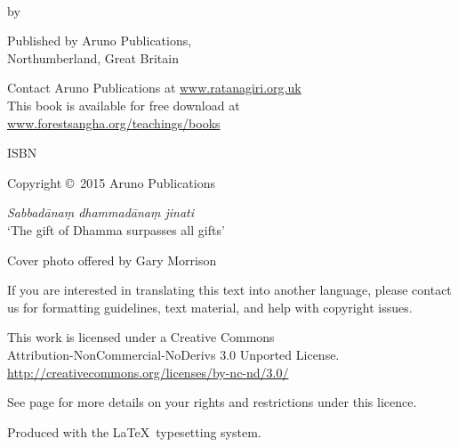 \cleartoverso
\thispagestyle{empty}
{\copyrightsize\setlength{\parskip}{0.5\baselineskip}\setlength{\parindent}{0em}%
\raggedright%
\shaker\color[gray]{0.3}

\thetitle\\
by \theauthor

Published by Aruno Publications,\\
Northumberland, Great Britain

Contact Aruno Publications at \href{http://ratanagiri.org.uk/}{www.ratanagiri.org.uk}\\
This book is available for free download at\\
\href{http://forestsangha.org/teachings/books}{www.forestsangha.org/teachings/books}

ISBN \theISBN

Copyright \copyright\ 2015 Aruno Publications

\textit{Sabbadānaṃ dhammadānaṃ jinati}\\
`The gift of Dhamma surpasses all gifts'

Cover photo offered by Gary Morrison

{\tiny
If you are interested in translating this text into another language, please contact us for formatting guidelines, text material, and help with copyright issues.

This work is licensed under a Creative Commons\\
Attribution-NonCommercial-NoDerivs 3.0 Unported License.\\
\href{http://creativecommons.org/licenses/by-nc-nd/3.0/}{http://creativecommons.org/licenses/by-nc-nd/3.0/}

See page \pageref{copyright-details} for more details on your rights and restrictions under this licence.

Produced with the \LaTeX\ typesetting system.

\theEditionInfo

}
}

